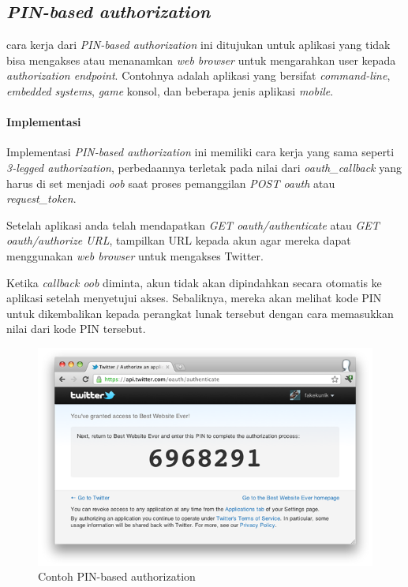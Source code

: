 \subsection{\textit{PIN-based authorization}}
cara kerja dari \textit{PIN-based authorization} ini ditujukan untuk aplikasi yang tidak bisa mengakses atau menanamkan \textit{web browser} untuk mengarahkan user kepada \textit{authorization endpoint}. Contohnya adalah aplikasi yang bersifat \textit{command-line}, \textit{embedded systems}, \textit{game} konsol, dan beberapa jenis aplikasi \textit{mobile}.


\paragraph{Implementasi}

Implementasi \textit{PIN-based authorization} ini memiliki cara kerja yang sama seperti \textit{3-legged authorization}, perbedaannya terletak pada nilai dari \textit{oauth\_callback} yang harus di set menjadi \textit{oob} saat proses pemanggilan \textit{POST oauth} atau \textit{request\_token}.

Setelah aplikasi anda telah mendapatkan \textit{GET oauth/authenticate} atau \textit{GET oauth/authorize URL}, tampilkan URL kepada akun agar mereka dapat menggunakan \textit{web browser} untuk mengakses Twitter.

Ketika \textit{callback oob} diminta, akun tidak akan dipindahkan secara otomatis ke aplikasi setelah menyetujui akses. Sebaliknya, mereka akan melihat kode PIN untuk dikembalikan kepada perangkat lunak tersebut dengan cara memasukkan nilai dari kode PIN tersebut.

\begin{figure}[H]
\centering
\includegraphics{Gambar/pin.png}
\caption{Contoh PIN-based authorization}
	\label{fig:pin}
\end{figure}

